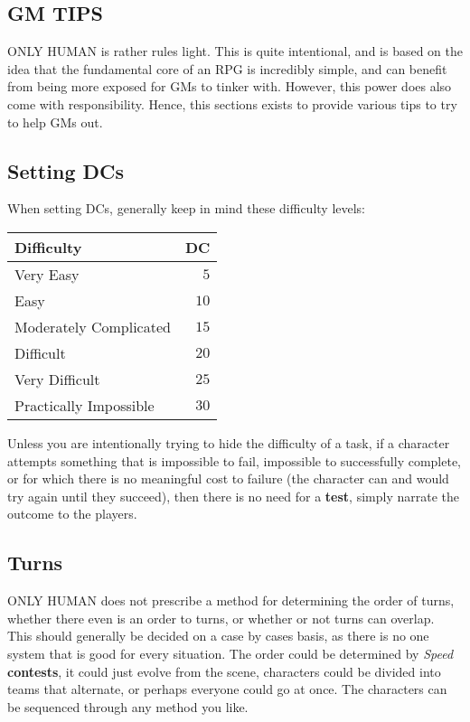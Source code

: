 \documentclass[11pt]{article}
\begin{document}
\begin{multicols}{3}
  \section*{GM TIPS}

  ONLY HUMAN is rather rules light. This is quite intentional, and is based on
  the idea that the fundamental core of an RPG is incredibly simple, and can
  benefit from being more exposed for GMs to tinker with. However, this power
  does also come with responsibility. Hence, this sections exists to provide
  various tips to try to help GMs out.

  \subsection*{Setting DCs}

  When setting DCs, generally keep in mind these difficulty levels:

  \begin{center}
    \begin{tabular}{ lr }
      Difficulty & DC \\
      \hline
      Very Easy & $5$ \\
      Easy & $10$ \\
      Moderately Complicated & $15$ \\
      Difficult & $20$ \\
      Very Difficult & $25$ \\
      Practically Impossible & $30$
    \end{tabular}
  \end{center}

  Unless you are intentionally trying to hide the difficulty of a task, if a
  character attempts something that is impossible to fail, impossible to
  successfully complete, or for which there is no meaningful cost to failure
  (the character can and would try again until they succeed), then there is no
  need for a \textbf{test}, simply narrate the outcome to the players.

  \subsection*{Turns}

  ONLY HUMAN does not prescribe a method for determining the order of turns,
  whether there even is an order to turns, or whether or not turns can overlap.
  This should generally be decided on a case by cases basis, as there is no one
  system that is good for every situation. The order could be determined by
  \textit{Speed} \textbf{contests}, it could just evolve from the scene,
  characters could be divided into teams that alternate, or perhaps everyone
  could go at once. The characters can be sequenced through any method you like.


\end{multicols}
\end{document}
